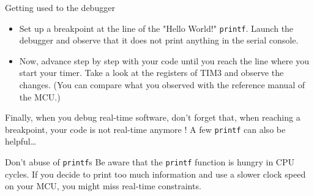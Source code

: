 \newpage
\begin{bclogo}[couleur = gray!20, arrondi = 0.2, logo=\bcquestion]{Getting used to the debugger}
\begin{itemize}
    \item Set up a breakpoint at the line of the "Hello World!" \texttt{printf}. Launch the debugger and observe that it does not print anything in the serial console.
    \item Now, advance step by step with your code until you reach the line where you start your timer. Take a look at the registers of TIM3 and observe the changes. (You can compare what you observed with the reference manual of the MCU.)
\end{itemize}
\end{bclogo}

Finally, when you debug real-time software, don't forget that, when reaching a breakpoint, your code is not real-time anymore ! A few \texttt{printf} can also be helpful\dots

\begin{bclogo}[couleur = gray!20, arrondi = 0.2, logo=\bcattention]{Don't abuse of \texttt{printf}s}
Be aware that the \texttt{printf} function is hungry in CPU cycles. If you decide to print too much information and use a slower clock speed on your MCU, you might miss real-time constraints.
\end{bclogo}
